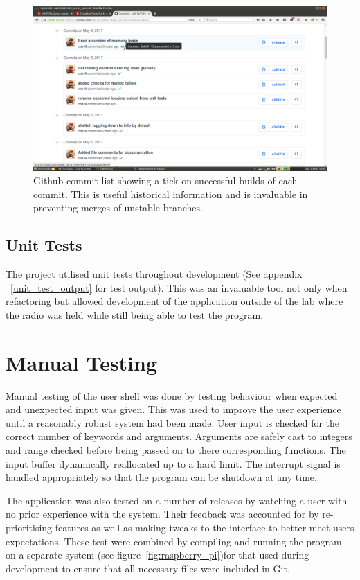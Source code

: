 \begin{figure}
    \centering
    \includegraphics[width=1\textwidth]{img/github_commits.png}
    \caption[Tests on github]{Github commit list showing a tick on successful builds of each commit. This is useful historical information and is invaluable in preventing merges of unstable branches.}
    \label{fig:github_commits}
\end{figure}

\subsection{Unit Tests}
The project utilised unit tests throughout development (See appendix ~\ref{unit_test_output} for test output). This was an invaluable tool not only when refactoring but allowed development of the application outside of the lab where the radio was held while still being able to test the program.


\section{Manual Testing}
Manual testing of the user shell was done by testing behaviour when expected and unexpected input was given. This was used to improve the user experience until a reasonably robust system had been made. User input is checked for the correct number of keywords and arguments. Arguments are safely cast to integers and range checked before being passed on to there corresponding functions. The input buffer dynamically reallocated up to a hard limit. The interrupt signal is handled appropriately so that the program can be shutdown at any time.

The application was also tested on a number of releases by watching a user with no prior experience with the system. Their feedback was accounted for by re-prioritising features as well as making tweaks to the interface to better meet users expectations. These test were combined by compiling and running the program on a separate system (see figure~\ref{fig:raspberry_pi})for that used during development to ensure that all necessary files were included in Git.

